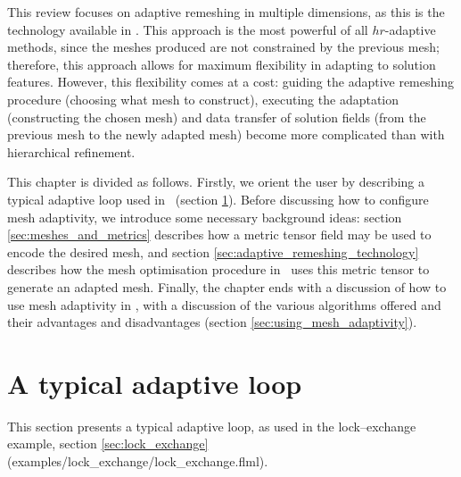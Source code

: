 This review focuses on adaptive remeshing in multiple dimensions, as this is
the technology available in \fluidity.
This approach is the most powerful of all $hr$-adaptive methods, since the meshes produced are not constrained
by the previous mesh; therefore, this approach allows for maximum flexibility in
adapting to solution features. However, this flexibility comes
at a cost: guiding the adaptive remeshing procedure (choosing
what mesh to construct), executing the adaptation (constructing
the chosen mesh) and data transfer of solution fields (from the previous mesh to
the newly adapted mesh) become more complicated than with hierarchical refinement.

This chapter is divided as follows. Firstly, we orient the user by describing a typical
adaptive loop used in \fluidity\ (section \ref{sec:typical_adaptive_loop}). Before
discussing how to configure mesh adaptivity, we introduce some necessary background ideas: 
section \ref{sec:meshes_and_metrics} describes how a metric tensor field
may be used to encode the desired mesh, and section \ref{sec:adaptive_remeshing_technology} describes how the
mesh optimisation procedure in \fluidity\ uses this metric tensor to generate an adapted mesh. Finally,
the chapter ends with a discussion of how to use mesh adaptivity in \fluidity, with a discussion
of the various algorithms offered and their advantages and disadvantages (section \ref{sec:using_mesh_adaptivity}).

\section{A typical adaptive loop} \label{sec:typical_adaptive_loop}
This section presents a typical adaptive loop, as used in the lock--exchange example, section \ref{sec:lock_exchange}
(examples/lock\_exchange/lock\_exchange.flml).

